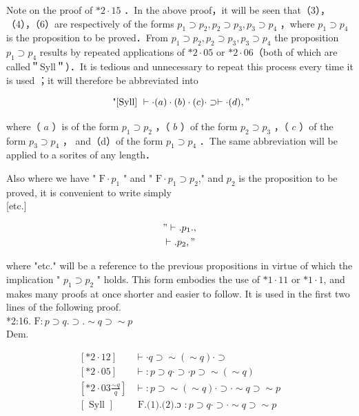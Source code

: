 \documentclass[10pt]{article}
\begin{document}
Note on the proof of $* 2 \cdot 15$ ．In the above proof，it will be seen that（3）， （4），（6）are respectively of the forms $p_{1} \supset p_{2}, p_{2} \supset p_{3}, p_{3} \supset p_{4}$ ，where $p_{1} \supset p_{4}$ is the proposition to be proved．From $p_{1} \supset p_{2}, p_{2} \supset p_{3}, p_{3} \supset p_{4}$ the proposition $p_{1} \supset p_{4}$ results by repeated applications of $* 2 \cdot 05$ or $* 2 \cdot 06$（both of which are called＂Syll＂）．It is tedious and unnecessary to repeat this process every time it is used ；it will therefore be abbreviated into

$$
\text { "[Syll] } \vdash \cdot(a) \cdot(b) \cdot(c) \cdot \supset \vdash \cdot(d), "
$$

where（ $a$ ）is of the form $p_{1} \supset p_{2}$ ，（ $b$ ）of the form $p_{2} \supset p_{3}$ ，（ $c$ ）of the form $p_{3} \supset p_{4}$ ， and（d）of the form $p_{1} \supset p_{4}$ ．The same abbreviation will be applied to a sorites of any length．

Also where we have " $\mathrm{F} \cdot p_{1}$ " and " $\mathrm{F} \cdot p_{1} \supset p_{2}$," and $p_{2}$ is the proposition to be proved, it is convenient to write simply\\[0pt]
[etc.]

$$
\begin{aligned}
& " \vdash . p_{1} ., \\
& \vdash . p_{2}, "
\end{aligned}
$$

where "etc." will be a reference to the previous propositions in virtue of which the implication " $p_{1} \supset p_{2}$ " holds. This form embodies the use of $* 1 \cdot 11$ or $* 1 \cdot 1$, and makes many proofs at once shorter and easier to follow. It is used in the first two lines of the following proof.\\
*2:16. $\mathrm{F}: p \supset q . \supset . \sim q \supset \sim p$\\
Dem.

\[
\begin{array}{ll}
{[* 2 \cdot 12]} & \vdash \cdot q \supset \sim(\sim q) \cdot \supset \\
{[* 2 \cdot 05]} & \vdash: p \supset q \cdot \supset \cdot p \supset \sim(\sim q) \\
{\left[* 2 \cdot 03 \frac{\sim q}{q}\right]} & \vdash: p \supset \sim(\sim q) \cdot \supset \cdot \sim q \supset \sim p  \tag{2}\\
{[\text { Syll }]} & \text { F.(1).(2).ɔ }: p \supset q \cdot \supset \cdot \sim q \supset \sim p
\end{array}
\]
\end{document}
